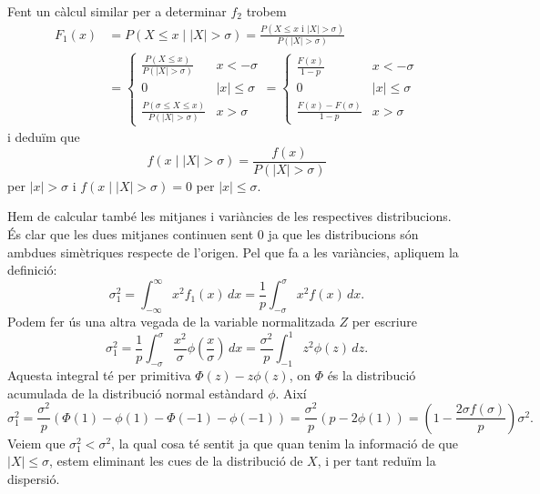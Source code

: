 \documentclass[12pt]{article}
\numberwithin{table}{section}
\numberwithin{figure}{section}
\numberwithin{equation}{section}
\newcommand{\abs}[1]{\left\lvert #1 \right\rvert}
\begin{document}
\begin{enumerate}[label=(\alph*), font=\bfseries \sffamily, wide, labelwidth=!, labelindent=0pt]
Fent un càlcul similar per a determinar \( f_2 \) trobem
\begin{align*}
	F_1(x) &= P(X \leq x \mid \abs{X} > \sigma) = \frac{P(X \leq x \text{ i } \abs{X} > \sigma)}{P(\abs{X} > \sigma)} \\
				 &= \left\{\begin{array}{lr}
	\frac{P(X \leq x)}{P(\abs{X} > \sigma)} & x < -\sigma \\ 
	0 & \abs{x} \leq \sigma \\
	\frac{P(\sigma \leq X \leq x)}{P(\abs{X} > \sigma)} & x > \sigma 
	\end{array} \right. 
	= \left\{\begin{array}{lr}
			\frac{F(x)}{1 - p} & x < -\sigma \\ 
			0 & \abs{x} \leq \sigma \\
			\frac{F(x) - F(\sigma)}{1 - p} & x > \sigma
	\end{array} \right.
\end{align*}
i deduïm que 
\begin{equation*}
	f(x \mid \abs{X} > \sigma) = \frac{f(x)}{P(\abs{X} > \sigma)}	
\end{equation*}
per \( \abs{x} > \sigma \) i \( f(x \mid \abs{X} > \sigma) = 0 \) per \( \abs{x} \leq \sigma \).

Hem de calcular també les mitjanes i variàncies de les respectives distribucions. És clar que les dues mitjanes continuen sent 0 ja que les distribucions són ambdues simètriques respecte de l'origen. Pel que fa a les variàncies, apliquem la definició:
\begin{equation*}
	\sigma_1^2 = \int_{-\infty}^{\infty} x^2f_1(x) \, dx = \frac{1}{p}\int_{-\sigma}^{\sigma}x^2 f(x)\,dx.
\end{equation*}
Podem fer ús una altra vegada de la variable normalitzada \( Z \) per escriure
\begin{equation*}
	\sigma_1^2 = \frac{1}{p}\int_{-\sigma}^{\sigma} \frac{x^2}{\sigma}\phi\left(\frac{x}{\sigma}\right)\,dx = \frac{\sigma^2}{p}\int_{-1}^{1} z^2\phi(z)\,dz.
\end{equation*}
Aquesta integral té per primitiva \( \Phi(z) - z\phi(z) \), on \( \Phi \) és la distribució acumulada de la distribució normal estàndard \( \phi \). Així
\begin{equation*}
	\sigma_1^2 = \frac{\sigma^2}{p} \left(\Phi(1) - \phi(1) - \Phi(-1) - \phi(-1)\right) = \frac{\sigma^2}{p}(p - 2\phi(1)) = \left(1 - \frac{2\sigma f(\sigma)}{p}\right) \sigma^2.
\end{equation*}
Veiem que \( \sigma_1^2 < \sigma^2 \), la qual cosa té sentit ja que quan tenim la informació de que \( \abs{X} \leq \sigma \), estem eliminant les cues de la distribució de \( X \), i per tant reduïm la dispersió. 


\end{enumerate}
\end{document}
